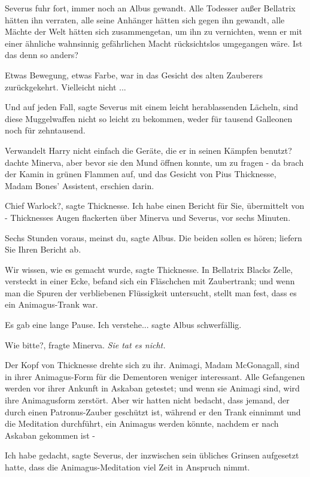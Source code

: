 Severus fuhr fort, immer noch an Albus gewandt. \glqq Alle Todesser außer
Bellatrix hätten ihn verraten, alle seine Anhänger hätten sich gegen ihn
gewandt, alle Mächte der Welt hätten sich zusammengetan, um ihn zu vernichten,
wenn er mit einer ähnliche wahnsinnig gefährlichen Macht rücksichtslos
umgegangen wäre. Ist das denn so anders?\grqq{}

Etwas Bewegung, etwas Farbe, war in das Gesicht des alten Zauberers
zurückgekehrt. \glqq Vielleicht nicht ...\grqq{}

\glqq Und auf jeden Fall\grqq{}, sagte Severus mit einem leicht herablassenden
Lächeln, \glqq sind diese Muggelwaffen nicht so leicht zu bekommen, weder für
tausend Galleonen noch für zehntausend.\grqq{}

Verwandelt Harry nicht einfach die Geräte, die er in seinen Kämpfen benutzt?
dachte Minerva, aber bevor sie den Mund öffnen konnte, um zu fragen - da brach
der Kamin in grünen Flammen auf, und das Gesicht von Pius Thicknesse, Madam
Bones' Assistent, erschien darin.

\glqq Chief Warlock?\grqq{}, sagte Thicknesse. \glqq Ich habe einen Bericht für
Sie, übermittelt von -\grqq{} Thicknesses Augen flackerten über Minerva und
Severus, \glqq vor sechs Minuten\grqq{}.

\glqq Sechs Stunden voraus, meinst du\grqq{}, sagte Albus. \glqq Die beiden
sollen es hören; liefern Sie Ihren Bericht ab.\grqq{}

\glqq Wir wissen, wie es gemacht wurde\grqq{}, sagte Thicknesse. \glqq In
Bellatrix Blacks Zelle, versteckt in einer Ecke, befand sich ein Fläschchen mit
Zaubertrank; und wenn man die Spuren der verbliebenen Flüssigkeit untersucht,
stellt man fest, dass es ein Animagus-Trank war.\grqq{}

Es gab eine lange Pause. \glqq Ich verstehe...\grqq{} sagte Albus schwerfällig.

\glqq Wie bitte?\grqq{}, fragte Minerva. \emph{Sie tat es nicht. }

Der Kopf von Thicknesse drehte sich zu ihr. \glqq Animagi, Madam McGonagall,
sind in ihrer Animagus-Form für die Dementoren weniger interessant. Alle
Gefangenen werden vor ihrer Ankunft in Askaban getestet; und wenn sie Animagi
sind, wird ihre Animagusform zerstört. Aber wir hatten nicht bedacht, dass
jemand, der durch einen Patronus-Zauber geschützt ist, während er den Trank
einnimmt und die Meditation durchführt, ein Animagus werden könnte, nachdem er
nach Askaban gekommen ist -\grqq{}

\glqq Ich habe gedacht\grqq{}, sagte Severus, der inzwischen sein übliches
Grinsen aufgesetzt hatte, \glqq dass die Animagus-Meditation viel Zeit in
Anspruch nimmt.\grqq{}

